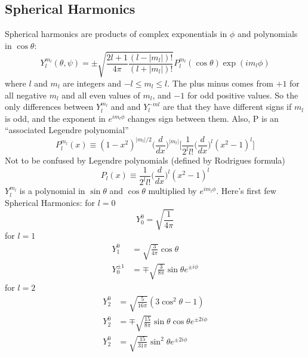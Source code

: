 \documentclass[../main.tex]{subfiles}
\begin{document}
\subsection*{Spherical Harmonics}
Spherical harmonics are products of complex exponentials in $\phi$ and polynomials in $\cos \theta$:
\begin{equation*}
    Y_l^{m_l}(\theta, \psi)=\pm \sqrt{ \frac{2l + 1}{4\pi} \frac{(l - |m_l|)!}{(l + |m_l|)!}}P_l^{m_l}(\cos\theta) \exp (im_l\phi )
\end{equation*}
where $l$ and $m_l$ are integers and $-l \leq m_l \leq l$. The plus minus comes from $+1$ for all negative $m_l$ and all even values of $m_l$, and $-1$ for odd positive values. So the only differences between $Y^{m_l}_l$ and and $Y^{-ml}_l$ are that they have different signs if $m_l$ is odd, and the exponent in $e^{im_l\phi}$ changes sign between them. Also, P is an “associated Legendre polynomial”
\begin{equation*}
    P_l^{m_l} (x)\equiv (1-x^2)^{|m_l|/2}\biggl(\frac{d}{dx}\biggr)^{|m_l|}\biggl[ \frac{1}{2^ll!}\biggl(\frac{d}{dx}\biggr)^l(x^2-1)^l\biggr]
\end{equation*}
Not to be confused by Legendre polynomials (defined by Rodrigues formula)
\begin{equation*}
    P_l (x)\equiv \frac{1}{2^ll!}\biggl(\frac{d}{dx}\biggr)^l(x^2-1)^l
\end{equation*}
$Y^{m_l}_l$ is a polynomial in $\sin \theta$ and $\cos \theta$ multiplied by $e^{im_l\phi}$. Here's first few Spherical Harmonics: for $l=0$
\begin{equation*}
    Y_0^0=\sqrt{\frac{1}{4\pi}}
\end{equation*}
for $l=1$
\begin{align*}
    Y_1^0&=\sqrt{\frac{3}{4\pi}}\cos\theta \\
    Y_0^{\pm1}&=\mp\sqrt{\frac{3}{8 \pi}}\sin\theta e^{\pm i\phi}
\end{align*}
for $l = 2$
\begin{align*}
    Y_2^0&=\sqrt{\frac{5}{16 \pi}}(3\cos^2\theta-1) \\
    Y_2^0&=\mp\sqrt{\frac{15}{8 \pi}}\sin\theta \cos \theta e^{\pm 2i\phi}\\
    Y_2^0&=\sqrt{\frac{15}{31 \pi}}\sin^2\theta e^{\pm 2i\phi}
\end{align*}
\end{document}

